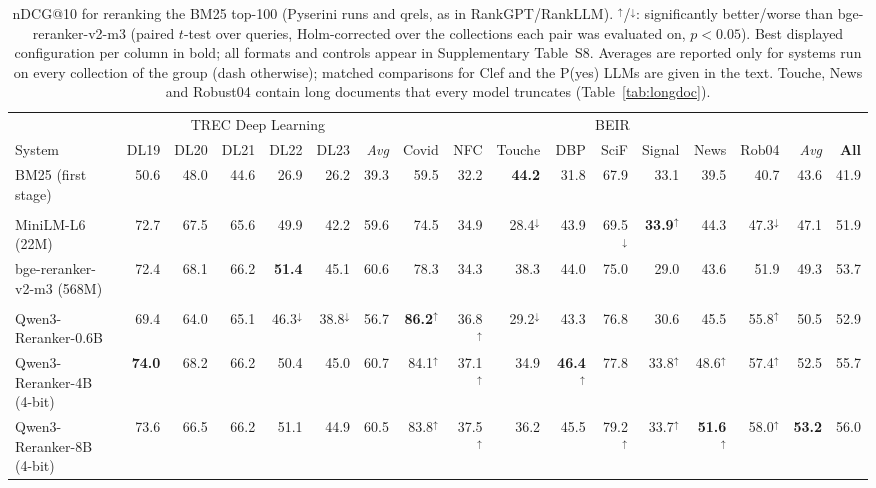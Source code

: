 \begin{table}[t]
\centering
\footnotesize
\setlength{\tabcolsep}{2.6pt}
\caption{nDCG@10 for reranking the BM25 top-100 (Pyserini runs and qrels, as in RankGPT/RankLLM). $^\uparrow$/$^\downarrow$: significantly better/worse than bge-reranker-v2-m3 (paired $t$-test over queries, Holm-corrected over the collections each pair was evaluated on, $p<0.05$). Best displayed configuration per column in bold; all formats and controls appear in Supplementary Table~S8. Averages are reported only for systems run on every collection of the group (dash otherwise); matched comparisons for Clef and the P(yes) LLMs are given in the text. Touche, News and Robust04 contain long documents that every model truncates (Table~\ref{tab:longdoc}).}
\label{tab:ranking}
\begin{tabular}{lrrrrr|r|rrrrrrrr|r|r}
\toprule
 & \multicolumn{6}{c|}{TREC Deep Learning} & \multicolumn{9}{c|}{BEIR} & \\
System & DL19 & DL20 & DL21 & DL22 & DL23 & \textit{Avg} & Covid & NFC & Touche & DBP & SciF & Signal & News & Rob04 & \textit{Avg} & \textbf{All} \\
\midrule
BM25 (first stage) & 50.6 & 48.0 & 44.6 & 26.9 & 26.2 & 39.3 & 59.5 & 32.2 & \textbf{44.2} & 31.8 & 67.9 & 33.1 & 39.5 & 40.7 & 43.6 & 41.9 \\
\addlinespace[1pt]
\multicolumn{17}{l}{\textit{Cross-encoders}} \\
MiniLM-L6 (22M) & 72.7 & 67.5 & 65.6 & 49.9 & 42.2 & 59.6 & 74.5 & 34.9 & 28.4$^\downarrow$ & 43.9 & 69.5$^\downarrow$ & \textbf{33.9}$^\uparrow$ & 44.3 & 47.3$^\downarrow$ & 47.1 & 51.9 \\
bge-reranker-v2-m3 (568M) & 72.4 & 68.1 & 66.2 & \textbf{51.4} & 45.1 & 60.6 & 78.3 & 34.3 & 38.3 & 44.0 & 75.0 & 29.0 & 43.6 & 51.9 & 49.3 & 53.7 \\
\addlinespace[1pt]
\multicolumn{17}{l}{\textit{Label-probability LLM rerankers}} \\
Qwen3-Reranker-0.6B & 69.4 & 64.0 & 65.1 & 46.3$^\downarrow$ & 38.8$^\downarrow$ & 56.7 & \textbf{86.2}$^\uparrow$ & 36.8$^\uparrow$ & 29.2$^\downarrow$ & 43.3 & 76.8 & 30.6 & 45.5 & 55.8$^\uparrow$ & 50.5 & 52.9 \\
Qwen3-Reranker-4B (4-bit) & \textbf{74.0} & 68.2 & 66.2 & 50.4 & 45.0 & 60.7 & 84.1$^\uparrow$ & 37.1$^\uparrow$ & 34.9 & \textbf{46.4}$^\uparrow$ & 77.8 & 33.8$^\uparrow$ & 48.6$^\uparrow$ & 57.4$^\uparrow$ & 52.5 & 55.7 \\
Qwen3-Reranker-8B (4-bit) & 73.6 & 66.5 & 66.2 & 51.1 & 44.9 & 60.5 & 83.8$^\uparrow$ & 37.5$^\uparrow$ & 36.2 & 45.5 & 79.2$^\uparrow$ & 33.7$^\uparrow$ & \textbf{51.6}$^\uparrow$ & 58.0$^\uparrow$ & \textbf{53.2} & 56.0 \\

\end{tabular}
\end{table}
